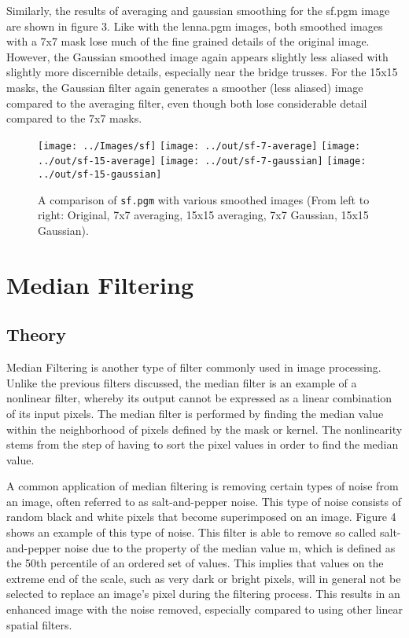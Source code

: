 \documentclass[headings=optiontoheadandtoc,listof=totoc,parskip=full]{scrartcl}
\begin{document}
Similarly, the results of averaging and gaussian smoothing for the sf.pgm image are shown in figure 3. Like with the lenna.pgm images, both smoothed images with a 7x7 mask lose much of the fine grained details of the original image. However, the Gaussian smoothed image again appears slightly less aliased with slightly more discernible details, especially near the bridge trusses. For the 15x15 masks, the Gaussian filter again generates a smoother (less aliased) image compared to the averaging filter, even though both lose considerable detail compared to the 7x7 masks.

\begin{figure}[ht]
	\centering
	\texttt{[image: ../Images/sf]}
	\texttt{[image: ../out/sf-7-average]}
	\texttt{[image: ../out/sf-15-average]}
	\texttt{[image: ../out/sf-7-gaussian]}
	\texttt{[image: ../out/sf-15-gaussian]}
	\caption{A comparison of \texttt{sf.pgm} with various smoothed images (From left to right: Original, 7x7 averaging, 15x15 averaging, 7x7 Gaussian, 15x15 Gaussian).}
	\label{fig:smoothing-result-1}
\end{figure}

\section{Median Filtering}
\label{sec:median}


\subsection{Theory}
\label{sec:median-theory}

Median Filtering is another type of filter commonly used in image processing. Unlike the previous filters discussed, the median filter is an example of a nonlinear filter, whereby its output cannot be expressed as a linear combination of its input pixels. The median filter is performed by finding the median value within the neighborhood of pixels defined by the mask or kernel. The nonlinearity stems from the step of having to sort the pixel values in order to find the median value. 

A common application of median filtering is removing certain types of noise from an image, often referred to as salt-and-pepper noise. This type of noise consists of random black and white pixels that become superimposed on an image. Figure 4 shows an example of this type of noise. This filter is able to remove so called salt-and-pepper noise due to the property of the median value m, which is defined as the 50th percentile of an ordered set of values. This implies that values on the extreme end of the scale, such as very dark or bright pixels, will in general not be selected to replace an image’s pixel during the filtering process. This results in an enhanced image with the noise removed, especially compared to using other linear spatial filters.
\end{document}

